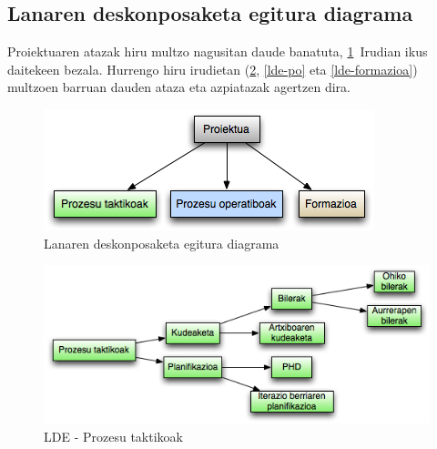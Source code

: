 \subsection{Lanaren deskonposaketa egitura diagrama}
Proiektuaren atazak hiru multzo nagusitan daude banatuta, \ref{lde}~Irudian ikus daitekeen bezala. Hurrengo hiru irudietan (\ref{lde-pt}, \ref{lde-po} eta \ref{lde-formazioa}) multzoen barruan dauden ataza eta azpiatazak agertzen dira.
\begin{figure}[htp]
\begin{center}
\includegraphics[scale=0.6]{Pictures/Chapter3/LDE.png}
\caption{Lanaren deskonposaketa egitura diagrama}
\label{lde}
\end{center}
\end{figure}
\begin{figure}[htp]
\begin{center}
\includegraphics[scale=0.5]{Pictures/Chapter3/LDE-PT.png}
\caption{LDE - Prozesu taktikoak}
\label{lde-pt}
\end{center}
\end{figure}

